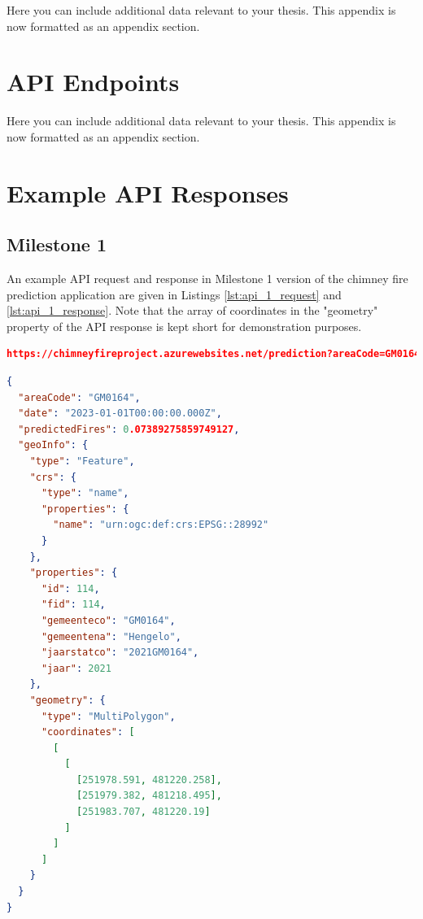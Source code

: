 \documentclass{utitcphd_overleaf}
\begin{document}
Here you can include additional data relevant to your thesis. This appendix is now formatted as an appendix section.

\chapter{API Endpoints}

Here you can include additional data relevant to your thesis. This appendix is now formatted as an appendix section.

\chapter{Example API Responses}

\section{Milestone 1}
\label{section:appendix_milestone_1}

An example API request and response in Milestone 1 version of the chimney fire prediction application are given in Listings \ref{lst:api_1_request} and \ref{lst:api_1_response}. Note that the array of coordinates in the "geometry" property of the API response is kept short for demonstration purposes.

\begin{lstlisting}[label={lst:api_1_request}, language=json, caption=Example API Request in Milestone 1, numbers=none]
https://chimneyfireproject.azurewebsites.net/prediction?areaCode=GM0164&date=2023-01-01
\end{lstlisting}

\begin{lstlisting}[label={lst:api_1_response}, language=json, caption=Example API Response in Milestone 1]
{
  "areaCode": "GM0164",
  "date": "2023-01-01T00:00:00.000Z",
  "predictedFires": 0.07389275859749127,
  "geoInfo": {
    "type": "Feature",
    "crs": {
      "type": "name",
      "properties": {
        "name": "urn:ogc:def:crs:EPSG::28992"
      }
    },
    "properties": {
      "id": 114,
      "fid": 114,
      "gemeenteco": "GM0164",
      "gemeentena": "Hengelo",
      "jaarstatco": "2021GM0164",
      "jaar": 2021
    },
    "geometry": {
      "type": "MultiPolygon",
      "coordinates": [
        [
          [
            [251978.591, 481220.258],
            [251979.382, 481218.495],
            [251983.707, 481220.19]
          ]
        ]
      ]
    }
  }
}
\end{lstlisting}
\end{document}
